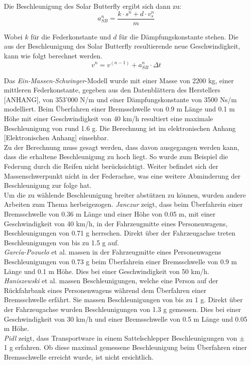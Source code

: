 \begin{description}
    Die Beschleunigung des Solar Butterfly ergibt sich dann zu:\\
    \begin{equation}
      a_{SB}^n = \frac{k \cdot s^n + d \cdot v_s^n}{m}
    \end{equation}

    Wobei $k$ für die Federkonstante und $d$ für die Dämpfungskonstante stehen.
    Die aus der Beschleunigung des Solar Butterfly resultierende neue Geschwindigkeit, kann wie folgt berechnet werden.
    \begin{equation}
      v^n = v^{(n-1)} + a_{SB}^n \cdot \Delta t
    \end{equation}

    Das \emph{Ein-Massen-Schwinger}-Modell wurde mit einer Masse von 2200 kg, einer mittleren Federkonstante, gegeben aus den Datenblättern des Herstellers [ANHANG], von 353'000 N/m und einer Dämpfungskonstante von 3500 Ns/m modelliert. Beim Überfahren einer Bremsschwelle von 0.9 m Länge und 0.1 m Höhe mit einer Geschwindigkeit von 40 km/h resultiert eine maximale Beschleunigung von rund 1.6 g. Die Berechnung ist im elektronischen Anhang [Elektronischen Anhang] einsehbar.\\
    Zu der Berechnung muss gesagt werden, dass davon ausgegangen werden kann, dass die erhaltene Beschleunigung zu hoch liegt. So wurde zum Beispiel die Federung durch die Reifen nicht berücksichtigt. Weiter befindet sich der Massenschwerpunkt nicht in der Federachse, was eine weitere Abminderung der Beschleunigung zur folge hat.\\

    Um die zu wählende Beschleunigung breiter abstützen zu können, wurden andere Arbeiten zum Thema herbeigezogen. \emph{Janczur} \cite{Beschl.1} zeigt, dass beim Überfahrein einer Bremsschwelle von 0.36 m Länge und einer Höhe von 0.05 m, mit einer Geschwindigkeit von 40 km/h, in der Fahrzeugmitte eines Personenwagens, Beschleunigungen von 0.71 g herrschen. Direkt über der Fahrzeugachse treten Beschleunigungen von bis zu 1.5 g auf.\\
    \emph{García-Pozuelo} et al. \cite{Beschl.2} massen in der Fahrzeugmitte eines Personenwagens Beschleunigungen von 0.73 g beim Überfahrein einer Bremsschwelle von 0.9 m Länge und 0.1 m Höhe. Dies bei einer Geschwindigkeit von 50 km/h.\\
    \emph{Haniszewski} et al. \cite{Beschl.3} massen Beschleunigungen, welche eine Person auf der Rückfahrbank eines Personenwagens während dem Überfahren einer Bremsschwelle erfährt. Sie massen Beschleunigungen von bis zu 1 g. Direkt über der Fahrzeugachse wurden Beschleunigungen von 1.3 g gemessen. Dies bei einer Geschwindigkeit von 30 km/h und einer Bremsschwelle von 0.5 m Länge und 0.05 m Höhe.\\
    \emph{Pidl} \cite{Beschl.4} zeigt, dass Transportware in einem Sattelschlepper Beschleunigungen von $\pm$ 1 g erfahren. Ob diese maximal gemessene Beschleunigung beim Überfahren einer Bremsschwelle erreicht wurde, ist nicht ersichtlich.


\end{description}
